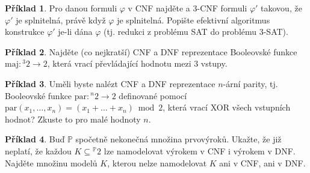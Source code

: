 \documentclass{amsart}
\theoremstyle{definition}
\newtheorem{problem}{Příklad}
\begin{document}
\bigskip\begin{problem} Pro danou formuli $\varphi$ v CNF najděte a 3-CNF formuli $\varphi'$ takovou, že $\varphi'$ je splnitelná, právě když $\varphi$ je splnitelná. Popište efektivní algoritmus konstrukce $\varphi'$ je-li dána $\varphi$ (tj. redukci z problému SAT do problému 3-SAT).
\end{problem}


\bigskip\begin{problem} Najděte (co nejkratší) CNF a DNF reprezentace Booleovské funkce $\mathrm{maj}: {^3}2\to 2$, která vrací převládající hodnotu mezi 3 vstupy.
\end{problem}


\bigskip\begin{problem} Uměli byste nalézt CNF a DNF reprezentace $n$-ární parity, tj. Booleovské funkce $\mathrm{par}: {^n}2\to 2$ definované pomocí $\mathrm{par}(x_1,\dots,x_n)=(x_1+\dots+x_n)\bmod 2$,
která vrací XOR všech vstupních hodnot? Zkuste to pro malé hodnoty $n$.
\end{problem}


\bigskip\begin{problem} Buď $\mathbb P$ spočetně nekonečná množina prvovýroků. Ukažte, že již neplatí, že každou $K\subseteq {^\mathbb P}2$ lze namodelovat výrokem v CNF i výrokem v DNF. Najděte množinu modelů $K$, kterou nelze namodelovat $K$ ani v CNF, ani v DNF.
\end{problem}







\end{document}
